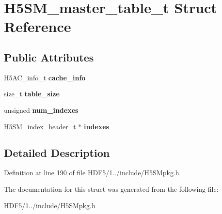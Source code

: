 \hypertarget{struct_h5_s_m__master__table__t}{}\section{H5\+S\+M\+\_\+master\+\_\+table\+\_\+t Struct Reference}
\label{struct_h5_s_m__master__table__t}
\subsection*{Public Attributes}
\begin{DoxyCompactItemize}
\item 
\mbox{\label{struct_h5_s_m__master__table__t_a56ee3ef8ccef90e1e78ec0832c3fa7dc}} 
H5\+A\+C\+\_\+info\+\_\+t {\bfseries cache\+\_\+info}
\item 
\mbox{\label{struct_h5_s_m__master__table__t_a5bc3e7fd970d51ccd6237279a913225c}} 
size\+\_\+t {\bfseries table\+\_\+size}
\item 
\mbox{\label{struct_h5_s_m__master__table__t_ab341b483ef21c7a728d77be712790652}} 
unsigned {\bfseries num\+\_\+indexes}
\item 
\mbox{\label{struct_h5_s_m__master__table__t_a44123334119c39c915612354014e3d16}} 
\hyperlink{struct_h5_s_m__index__header__t}{H5\+S\+M\+\_\+index\+\_\+header\+\_\+t} $\ast$ {\bfseries indexes}
\end{DoxyCompactItemize}


\subsection{Detailed Description}


Definition at line \hyperlink{_h_d_f5_21_810_81_2include_2_h5_s_mpkg_8h_source_l00190}{190} of file \hyperlink{_h_d_f5_21_810_81_2include_2_h5_s_mpkg_8h_source}{H\+D\+F5/1../include/\+H5\+S\+Mpkg.\+h}.



The documentation for this struct was generated from the following file\+:\begin{DoxyCompactItemize}
\item 
H\+D\+F5/1../include/\+H5\+S\+Mpkg.\+h\end{DoxyCompactItemize}
